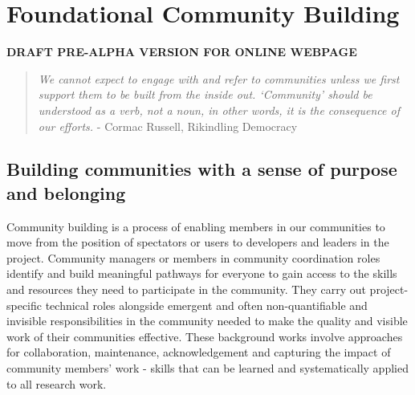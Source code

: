 \documentclass[
  letterpaper,
  DIV=11,
  numbers=noendperiod]{scrreport}
\author{Malvika Sharan}
\date{2021-10-12}
\renewcommand*\contentsname{Table of contents}
\newcommand\contentsname{Table of contents}
\begin{document}
\ifdefined\Shaded\renewenvironment{Shaded}{\begin{tcolorbox}[frame hidden, borderline west={3pt}{0pt}{shadecolor}, sharp corners, interior hidden, boxrule=0pt, enhanced, breakable]}{\end{tcolorbox}}\fi

\renewcommand*\contentsname{Table of contents}
{
\hypersetup{linkcolor=}
\setcounter{tocdepth}{2}
\tableofcontents
}

\hypertarget{foundational-community-building}{%
\chapter{Foundational Community
Building}\label{foundational-community-building}}

\textbf{DRAFT PRE-ALPHA VERSION FOR ONLINE WEBPAGE}

\begin{quote}
\emph{We cannot expect to engage with and refer to communities unless we
first support them to be built from the inside out. `Community' should
be understood as a verb, not a noun, in other words, it is the
consequence of our efforts.} - Cormac Russell, Rikindling Democracy
\end{quote}

\hypertarget{building-communities-with-a-sense-of-purpose-and-belonging}{%
\section{Building communities with a sense of purpose and
belonging}\label{building-communities-with-a-sense-of-purpose-and-belonging}}

Community building is a process of enabling members in our communities
to move from the position of spectators or users to developers and
leaders in the project. Community managers or members in community
coordination roles identify and build meaningful pathways for everyone
to gain access to the skills and resources they need to participate in
the community. They carry out project-specific technical roles alongside
emergent and often non-quantifiable and invisible responsibilities in
the community needed to make the quality and visible work of their
communities effective. These background works involve approaches for
collaboration, maintenance, acknowledgement and capturing the impact of
community members' work - skills that can be learned and systematically
applied to all research work.
\end{document}
